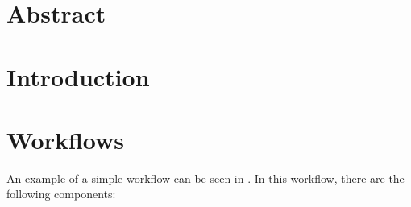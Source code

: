 \documentclass[a4paper]{article}
\title{\papertitle}
\author{Julian M. Kunkel
  \textit{University of Reading}
	\and
  Luciana R. Pedro
  \textit{University of Reading}
}
\date{\today}
\begin{document}
\maketitle
\thispagestyle{fancy}

\section*{Abstract}

\section{Introduction}

\section{Workflows}
\label{sec:background}

An example of a simple workflow can be seen in . In this workflow, there are the following components:
\end{document}
